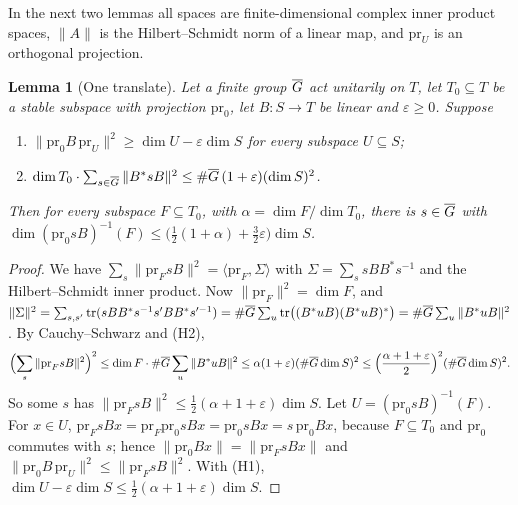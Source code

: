 \documentclass[10pt]{amsart}
\newtheorem{lemma}[theorem]{Lemma}
\theoremstyle{definition}
\theoremstyle{remark}
\begin{document}
In the next two lemmas all spaces are finite-dimensional complex inner product spaces, $\|A\|$ is
the Hilbert--Schmidt norm of a linear map, and $\mathrm{pr}_U$ is an orthogonal projection.

\begin{lemma}[One translate]\label{au:onetranslate}
Let a finite group $\overline G$ act unitarily on $T$, let $T_0\subseteq T$ be a stable subspace with
projection $\mathrm{pr}_0$, let $B\colon S\to T$ be linear and $\varepsilon\ge0$. Suppose
\begin{enumerate}
\item[(H1)] $\|\mathrm{pr}_0B\,\mathrm{pr}_U\|^2\ge\dim U-\varepsilon\dim S$ for every subspace
$U\subseteq S$;
\item[(H2)] $\dim T_0\cdot\sum_{s\in\overline G}\|B^*sB\|^2\le\#\overline G\,(1+\varepsilon)(\dim S)^2$.
\end{enumerate}
Then for every subspace $F\subseteq T_0$, with $\alpha=\dim F/\dim T_0$, there is $s\in\overline G$ with
$\dim(\mathrm{pr}_0sB)^{-1}(F)\le\bigl(\tfrac12(1+\alpha)+\tfrac32\varepsilon\bigr)\dim S$.
\end{lemma}
\begin{proof}
We have $\sum_s\|\mathrm{pr}_FsB\|^2=\langle\mathrm{pr}_F,\Sigma\rangle$ with
$\Sigma=\sum_ssBB^*s^{-1}$ and the Hilbert--Schmidt inner product. Now $\|\mathrm{pr}_F\|^2=\dim
F$, and $\|\Sigma\|^2=\sum_{s,s'}\operatorname{tr}(sBB^*s^{-1}s'BB^*s'^{-1})=\#\overline G\sum_u
\operatorname{tr}\bigl((B^*uB)(B^*uB)^*\bigr)=\#\overline G\sum_u\|B^*uB\|^2$. By Cauchy--Schwarz and
(H2),
\[
\Bigl(\sum_s\|\mathrm{pr}_FsB\|^2\Bigr)^2\le\dim F\cdot\#\overline G\sum_u\|B^*uB\|^2\le\alpha(1+
\varepsilon)(\#\overline G\dim S)^2\le\Bigl(\frac{\alpha+1+\varepsilon}2\Bigr)^2(\#\overline G\dim S)^2 .
\]
So some $s$ has $\|\mathrm{pr}_FsB\|^2\le\tfrac12(\alpha+1+\varepsilon)\dim S$. Let
$U=(\mathrm{pr}_0sB)^{-1}(F)$. For $x\in U$, $\mathrm{pr}_FsBx=\mathrm{pr}_F\mathrm{pr}_0sBx=
\mathrm{pr}_0sBx=s\,\mathrm{pr}_0Bx$, because $F\subseteq T_0$ and $\mathrm{pr}_0$ commutes with
$s$; hence $\|\mathrm{pr}_0Bx\|=\|\mathrm{pr}_FsBx\|$ and
$\|\mathrm{pr}_0B\,\mathrm{pr}_U\|^2\le\|\mathrm{pr}_FsB\|^2$. With (H1),
$\dim U-\varepsilon\dim S\le\tfrac12(\alpha+1+\varepsilon)\dim S$.
\end{proof}
\end{document}
